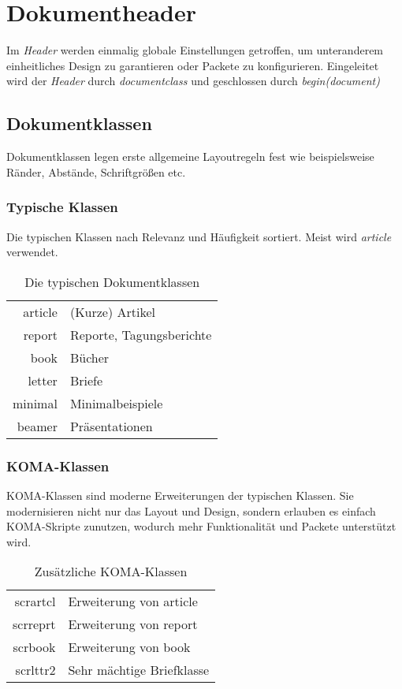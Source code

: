 \section{Dokumentheader}
Im \textit{Header} werden einmalig globale Einstellungen getroffen, um unteranderem einheitliches Design zu garantieren oder Packete zu konfigurieren.
Eingeleitet wird der \textit{Header} durch \textit{documentclass} und geschlossen durch \textit{begin(document)}

\subsection{Dokumentklassen}
Dokumentklassen legen erste allgemeine Layoutregeln fest wie beispielsweise Ränder, Abstände, Schriftgrößen etc.
\subsubsection{Typische Klassen}
Die typischen Klassen nach Relevanz und Häufigkeit sortiert. Meist wird \textit{article} verwendet.
\begin{table}[h]
    \centering
    \begin{tabular}{rl}
        article & (Kurze) Artikel          \\
        report  & Reporte, Tagungsberichte \\
        book    & Bücher                   \\
        letter  & Briefe                   \\
        minimal & Minimalbeispiele         \\
        beamer  & Präsentationen
    \end{tabular}
    \caption{Die typischen Dokumentklassen}
    \label{typischeDokumentKlassen}
\end{table}

\subsubsection{KOMA-Klassen}
KOMA-Klassen sind moderne Erweiterungen der typischen Klassen. Sie modernisieren nicht nur das Layout und Design, sondern erlauben es einfach KOMA-Skripte zunutzen, wodurch mehr Funktionalität und Packete unterstützt wird.

\begin{table}[h]
    \centering
    \begin{tabular}{rl}
        scrartcl & Erweiterung von article   \\
        scrreprt & Erweiterung von report    \\
        scrbook  & Erweiterung von book      \\
        scrlttr2 & Sehr mächtige Briefklasse \\
    \end{tabular}
    \caption{Zusätzliche KOMA-Klassen}
    \label{KOMAKlassen}
\end{table}

